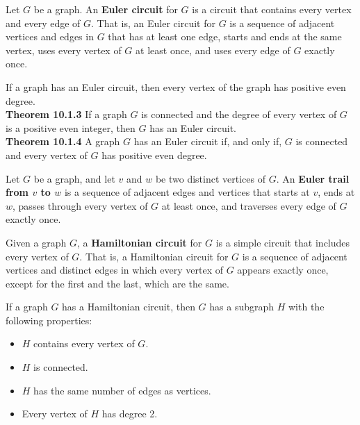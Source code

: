 \documentclass[../mathNotesPreamble]{subfiles}
\begin{document}
  \begin{defn*}
    Let $G$ be a graph. An \textbf{Euler circuit} for $G$ is a circuit that contains every vertex and every edge of $G$. That is, an Euler circuit for $G$ is a sequence of adjacent vertices and edges in $G$ that has at least one edge, starts and ends at the same vertex, uses every vertex of $G$ at least once, and uses every edge of $G$ exactly once.
  \end{defn*}

  \begin{thmBox*}[Theorem 10.1.2]
    If a graph has an Euler circuit, then every vertex of the graph has positive even degree.\\

    \textbf{Theorem 10.1.3}\newline
    If a graph $G$ is connected and the degree of every vertex of $G$ is a positive even integer, then $G$ has an Euler circuit.\\

    \textbf{Theorem 10.1.4}\newline
    A graph $G$ has an Euler circuit if, and only if, $G$ is connected and every vertex of $G$ has positive even degree.
  \end{thmBox*}

  \begin{defn*}
    Let $G$ be a graph, and let $v$ and $w$ be two distinct vertices of $G$. An \textbf{Euler trail from $v$ to $w$} is a sequence of adjacent edges and vertices that starts at $v$, ends at $w$, passes through every vertex of $G$ at least once, and traverses every edge of $G$ exactly once.
  \end{defn*}
  \pagebreak

  \begin{defn*}
    Given a graph $G$, a \textbf{Hamiltonian circuit} for $G$ is a simple circuit that includes every vertex of $G$. That is, a Hamiltonian circuit for $G$ is a sequence of adjacent vertices and distinct edges in which every vertex of $G$ appears exactly once, except for the first and the last, which are the same.
  \end{defn*}

  \begin{thmBox*}[Proposition 10.1.6]
    If a graph $G$ has a Hamiltonian circuit, then $G$ has a subgraph $H$ with the following properties:
    \begin{itemize}
      \item $H$ contains every vertex of $G$.
      \item $H$ is connected.
      \item $H$ has the same number of edges as vertices.
      \item Every vertex of $H$ has degree 2.
    \end{itemize}
  \end{thmBox*}
\end{document}
